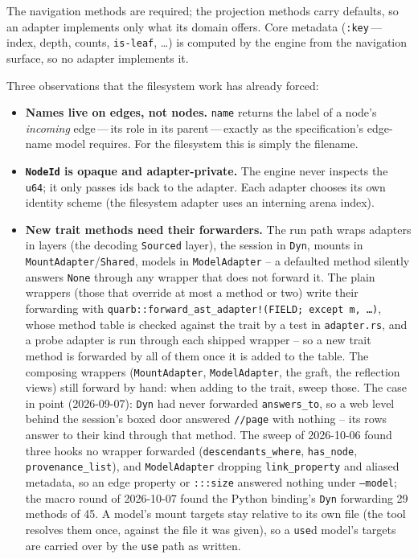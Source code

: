 \documentclass{report}
\begin{document}
\noindent
The navigation methods are required; the projection methods carry
defaults, so an adapter implements only what its domain offers. Core
metadata (\texttt{:key}\,---\,index, depth, counts, \texttt{is-leaf},
\dots) is computed by the engine from the navigation surface, so no
adapter implements it.

Three observations that the filesystem work has already forced:

\begin{itemize}
\item \textbf{Names live on edges, not nodes.} \texttt{name} returns
  the label of a node's \emph{incoming} edge\,---\,its role in its
  parent\,---\,exactly as the specification's edge-name model
  requires. For the filesystem this is simply the filename.

\item \textbf{\texttt{NodeId} is opaque and adapter-private.} The
  engine never inspects the \texttt{u64}; it only passes ids back to
  the adapter. Each adapter chooses its own identity scheme (the
  filesystem adapter uses an interning arena index).

\item \textbf{New trait methods need their forwarders.} The run
  path wraps adapters in layers (the decoding \texttt{Sourced}
  layer), the session in \texttt{Dyn}, mounts in
  \texttt{MountAdapter}/\texttt{Shared}, models in
  \texttt{ModelAdapter} -- a defaulted method silently answers
  \texttt{None} through any wrapper that does not forward it.
  The plain wrappers (those that override at most a method or
  two) write their forwarding with
  \texttt{quarb::forward\_ast\_adapter!(FIELD; except m, \ldots)},
  whose method table is checked against the trait by a test in
  \texttt{adapter.rs}, and a probe adapter is run through each
  shipped wrapper -- so a new trait method is forwarded by all
  of them once it is added to the table. The composing wrappers
  (\texttt{MountAdapter}, \texttt{ModelAdapter}, the graft, the
  reflection views) still forward by hand: when adding to the
  trait, sweep those. The
  case in point (2026-09-07): \texttt{Dyn} had never forwarded
  \texttt{answers\_to}, so a web level behind the session's
  boxed door answered \texttt{//page} with nothing -- its rows
  answer to their kind through that method. The sweep of 2026-10-06 found three hooks
  no wrapper forwarded (\texttt{descendants\_where},
  \texttt{has\_node}, \texttt{provenance\_list}), and
  \texttt{ModelAdapter} dropping \texttt{link\_property} and
  aliased metadata, so an edge property or \texttt{:::size}
  answered nothing under \texttt{--model}; the macro round of
  2026-10-07 found the Python binding's \texttt{Dyn} forwarding
  29 methods of 45. A model's mount
  targets stay relative to its own file (the tool resolves
  them once, against the file it was given), so a
  \texttt{use}d model's targets are carried over by the
  \texttt{use} path as written.


\end{itemize}
\end{document}
